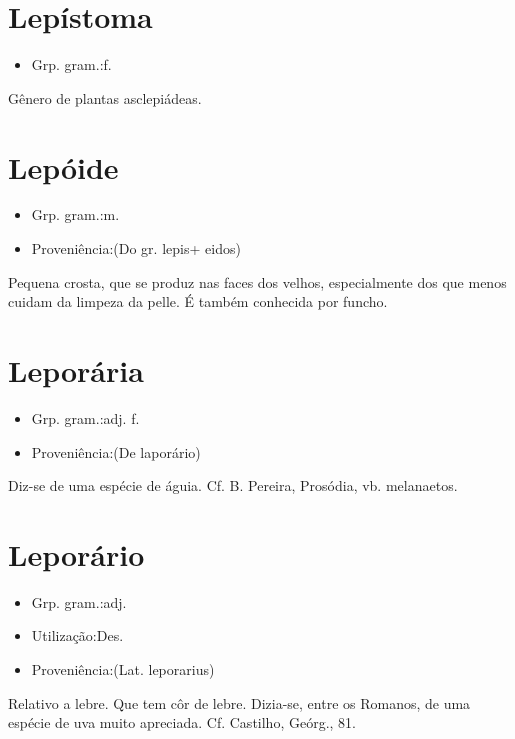 \section{Lepístoma}
\begin{itemize}
\item {Grp. gram.:f.}
\end{itemize}
Gênero de plantas asclepiádeas.
\section{Lepóide}
\begin{itemize}
\item {Grp. gram.:m.}
\end{itemize}
\begin{itemize}
\item {Proveniência:(Do gr. \textunderscore lepis\textunderscore  + \textunderscore eidos\textunderscore )}
\end{itemize}
Pequena crosta, que se produz nas faces dos velhos, especialmente dos que menos cuidam da limpeza da pelle.
É também conhecida por \textunderscore funcho\textunderscore .
\section{Leporária}
\begin{itemize}
\item {Grp. gram.:adj. f.}
\end{itemize}
\begin{itemize}
\item {Proveniência:(De \textunderscore laporário\textunderscore )}
\end{itemize}
Diz-se de uma espécie de águia. Cf. B. Pereira, \textunderscore Prosódia\textunderscore , vb. \textunderscore melanaetos\textunderscore .
\section{Leporário}
\begin{itemize}
\item {Grp. gram.:adj.}
\end{itemize}
\begin{itemize}
\item {Utilização:Des.}
\end{itemize}
\begin{itemize}
\item {Proveniência:(Lat. \textunderscore leporarius\textunderscore )}
\end{itemize}
Relativo a lebre.
Que tem côr de lebre.
Dizia-se, entre os Romanos, de uma espécie de uva muito apreciada. Cf. Castilho, \textunderscore Geórg.\textunderscore , 81.
